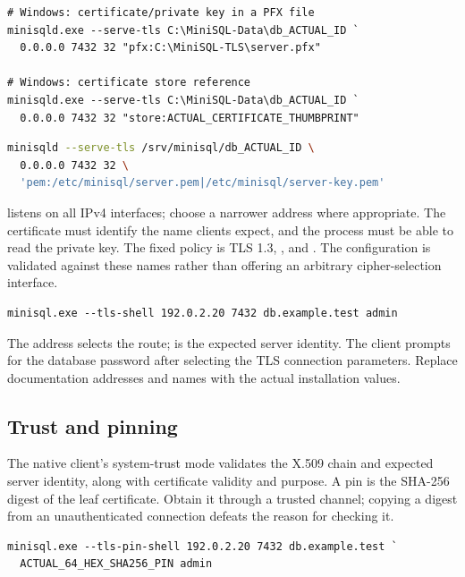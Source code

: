 \begin{lstlisting}
# Windows: certificate/private key in a PFX file
minisqld.exe --serve-tls C:\MiniSQL-Data\db_ACTUAL_ID `
  0.0.0.0 7432 32 "pfx:C:\MiniSQL-TLS\server.pfx"

# Windows: certificate store reference
minisqld.exe --serve-tls C:\MiniSQL-Data\db_ACTUAL_ID `
  0.0.0.0 7432 32 "store:ACTUAL_CERTIFICATE_THUMBPRINT"
\end{lstlisting}

\begin{lstlisting}[language=bash]
minisqld --serve-tls /srv/minisql/db_ACTUAL_ID \
  0.0.0.0 7432 32 \
  'pem:/etc/minisql/server.pem|/etc/minisql/server-key.pem'
\end{lstlisting}

 listens on all IPv4 interfaces; choose a narrower address
where appropriate. The certificate must identify the name clients expect,
and the process must be able to read the private key. The fixed policy is
TLS 1.3, \code{TLS\_AES\_256\_GCM\_SHA384}, and \code{X25519}.
The configuration is validated against these names rather than offering an
arbitrary cipher-selection interface.

\begin{lstlisting}
minisql.exe --tls-shell 192.0.2.20 7432 db.example.test admin
\end{lstlisting}

The address selects the route;  is the expected
server identity. The client prompts for the database password after selecting
the TLS connection parameters. Replace documentation addresses and names with
the actual installation values.

\subsection{Trust and pinning}

The native client's system-trust mode validates the X.509 chain and expected
server identity, along with certificate validity and purpose. A pin is the
SHA-256 digest of the leaf certificate. Obtain it through a trusted channel;
copying a digest from an unauthenticated connection defeats the reason for
checking it.

\begin{lstlisting}
minisql.exe --tls-pin-shell 192.0.2.20 7432 db.example.test `
  ACTUAL_64_HEX_SHA256_PIN admin
\end{lstlisting}

